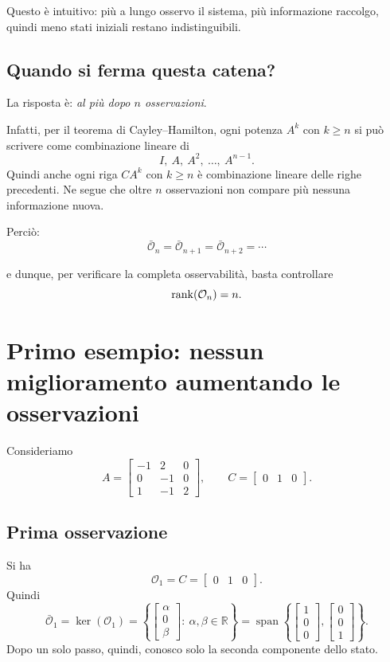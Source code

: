 Questo è intuitivo: più a lungo osservo il sistema, più informazione raccolgo, quindi meno stati iniziali restano indistinguibili.

\subsection{Quando si ferma questa catena?}

La risposta è: \emph{al più dopo \(n\) osservazioni}.

Infatti, per il teorema di Cayley--Hamilton, ogni potenza \(A^k\) con \(k\ge n\) si può scrivere come combinazione lineare di
\[
I,\ A,\ A^2,\ \dots,\ A^{n-1}.
\]
Quindi anche ogni riga \(CA^k\) con \(k\ge n\) è combinazione lineare delle righe precedenti.  
Ne segue che oltre \(n\) osservazioni non compare più nessuna informazione nuova.

Perciò:
\[
\bar{\mathcal O}_n=\bar{\mathcal O}_{n+1}=\bar{\mathcal O}_{n+2}=\cdots
\]

e dunque, per verificare la completa osservabilità, basta controllare
\[
\rank(\mathcal O_n)=n.
\]

\section{Primo esempio: nessun miglioramento aumentando le osservazioni}

Consideriamo
\[
A=
\begin{bmatrix}
-1 & 2 & 0\\
0 & -1 & 0\\
1 & -1 & 2
\end{bmatrix},
\qquad
C=
\begin{bmatrix}
0 & 1 & 0
\end{bmatrix}.
\]

\subsection{Prima osservazione}

Si ha
\[
\mathcal O_1=C=
\begin{bmatrix}
0 & 1 & 0
\end{bmatrix}.
\]
Quindi
\[
\bar{\mathcal O}_1=\ker(\mathcal O_1)
=
\left\{
\begin{bmatrix}
\alpha\\
0\\
\beta
\end{bmatrix}
:\ \alpha,\beta\in\mathbb R
\right\}
=
\operatorname{span}\left\{
\begin{bmatrix}
1\\0\\0
\end{bmatrix},
\begin{bmatrix}
0\\0\\1
\end{bmatrix}
\right\}.
\]
Dopo un solo passo, quindi, conosco solo la seconda componente dello stato.

